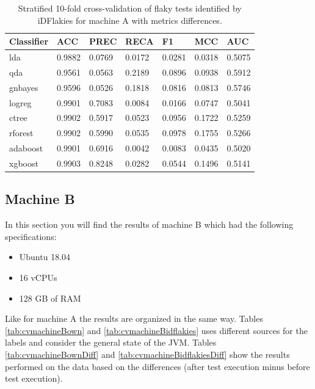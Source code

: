 \documentclass{seal_thesis}
\begin{document}
\begin{table}[ht]
\centering
\begin{tabular}{|l|l|l|l|l|l|l|}
\hline
\textbf{Classifier} & \textbf{ACC} & \textbf{PREC} & \textbf{RECA} & \textbf{F1} & \textbf{MCC} & \textbf{AUC} \\ \hline
  lda & 0.9882 & 0.0769 & 0.0172 & 0.0281 & 0.0318 & 0.5075 \\ \hline
  qda & 0.9561 & 0.0563 & 0.2189 & 0.0896 & 0.0938 & 0.5912 \\ \hline
  gnbayes & 0.9596 & 0.0526 & 0.1818 & 0.0816 & 0.0813 & 0.5746 \\ \hline
  logreg & 0.9901 & 0.7083 & 0.0084 & 0.0166 & 0.0747 & 0.5041 \\ \hline
  ctree & 0.9902 & 0.5917 & 0.0523 & 0.0956 & 0.1722 & 0.5259 \\ \hline
  rforest & 0.9902 & 0.5990 & 0.0535 & 0.0978 & 0.1755 & 0.5266 \\ \hline
  adaboost & 0.9901 & 0.6916 & 0.0042 & 0.0083 & 0.0435 & 0.5020 \\ \hline
  xgboost & 0.9903 & 0.8248 & 0.0282 & 0.0544 & 0.1496 & 0.5141 \\ \hline
\end{tabular}
\caption{Stratified 10-fold cross-validation of flaky tests identified by iDFlakies for machine A with metrics differences.}
\label{tab:cvmachineAidflakiesDiff}
\end{table}


\subsection{Machine B}
In this section you will find the results of machine B which had the following specifications:

\begin{itemize}
\item Ubuntu 18.04
\item 16 vCPUs
\item 128 GB of RAM
\end{itemize}

\noindent Like for machine A the results are organized in the same way. Tables \ref{tab:cvmachineBown} and \ref{tab:cvmachineBidflakies} uses different sources for the labels and consider the general state of the JVM. Tables \ref{tab:cvmachineBownDiff} and \ref{tab:cvmachineBidflakiesDiff} show the results performed on the data based on the differences (after test execution minus before test execution). \\
\end{document}
